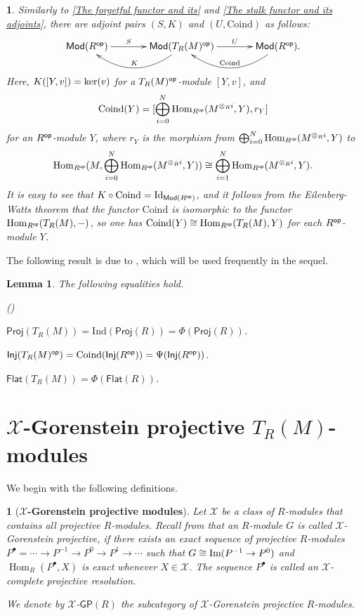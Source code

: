 \documentclass[10pt,twoside]{amsart}
\theoremstyle{bfupright head,slanted body}
\theoremstyle{bfupright head,upright body}
\newtheorem{bfhpg}[res]{}               \newtheorem*{bfhpg*}{}
\theoremstyle{fixed bf head,slanted body}
\newtheorem{lem}[res]{Lemma}            \newtheorem*{lem*}{Lemma}
\theoremstyle{fixed bf head,upright body}
\theoremstyle{numbered paragraph}
\newtheorem{ipg}[res]{}
\newlength{\thmlistleft}        %
\newlength{\thmlistright}       %
\newlength{\thmlistpartopsep}   %
\newlength{\thmlisttopsep}      %
\newlength{\thmlistparsep}      %
\newlength{\thmlistitemsep}     %
\newcounter{prt}
\newenvironment{prt}{\begin{list}{\upshape (\alph{prt})}%
    {\usecounter{prt}%
      \setlength{\leftmargin}{\thmlistleft}%
      \setlength{\labelwidth}{\thmlistleft}%
      \setlength{\rightmargin}{\thmlistright}%
      \setlength{\partopsep}{\thmlistpartopsep}%
      \setlength{\topsep}{\thmlisttopsep}%
      \setlength{\parsep}{\thmlistparsep}%
      \setlength{\itemsep}{\thmlistitemsep}}}%
  {\end{list}}%
\numberwithin{equation}{res}
\newcommand{\GP}{\mathsf{GP}}
\newcommand{\Proj}{\mathsf{Proj}}
\newcommand{\Inj}{\mathsf{Inj}}
\newcommand{\Flat}{\mathsf{Flat}}
\newcommand{\Mod}{\mathsf{Mod}}
\newcommand{\Coind}{\mathrm{Coind}}
\newcommand{\Ind}{\mathrm{Ind}}
\newcommand{\Id}{\mathrm{Id}}
\newcommand{\Rop}{R^{\sf op}}
\newcommand{\op}{\sf op}
\newcommand{\kernel}{\mbox{\rm ker}}
\newcommand{\im}{\mbox{\rm Im}}
\newcommand{\Hom}{\operatorname{Hom}}
\newcommand{\is}{\cong}
\begin{document}
\begin{ipg}\label{adjoint pairs-dual}
Similarly to \ref{The forgetful functor and its} and \ref{The stalk functor and its adjoints}, there are adjoint pairs $(S, K)$ and $(U, \Coind)$ as follows:
  \begin{equation*}
  \xymatrix@C=3pc{
    \Mod(\Rop)
    \ar[r]^-{S}
    &
    \Mod(T_R(M)^{\op})
    \ar@/^1.8pc/[l]_-{K}
    \ar[r]^-{U}
    &
    \Mod(\Rop).
    \ar@/^1.8pc/[l]_-{\Coind}
  }
  \end{equation*}
Here, $K([Y,v])=\kernel(v)$ for a $T_R(M)^{\op}$-module $[Y,v]$, and
$$\Coind(Y)=[\bigoplus_{i=0}^N\Hom_{\Rop}(M^{\otimes_Ri},Y),r_Y]$$
for an $\Rop$-module $Y$, where $r_Y$ is the morphism from
$\bigoplus_{i=0}^N\Hom_{\Rop}(M^{\otimes_Ri},Y)$ to
\[\Hom_{\Rop}(M,\bigoplus_{i=0}^N\Hom_{\Rop}(M^{\otimes_Ri},Y)) \cong
\bigoplus_{i=1}^N\Hom_{\Rop}(M^{\otimes_Ri},Y).\]
It is easy to see that $K\circ\Coind=\Id_{\Mod(\Rop)}$, and
it follows from the Eilenberg-Watts theorem that the functor $\Coind$ is isomorphic to the functor $\Hom_{\Rop}(T_R(M),-)$, so one has $\Coind(Y)\is \Hom_{\Rop}(T_R(M),Y)$ for each $\Rop$-module $Y$.
\end{ipg}

The following result is due to \cite[Lemma 1.9]{DL},
which will be used frequently in the sequel.

\begin{lem} \label{homological modules}
The following equalities hold.
\begin{prt}
\item $\Proj(T_R(M))=\Ind(\Proj(R))=\Phi(\Proj(R))$.
\item $\Inj(T_R(M)^{\op})=\Coind(\Inj(R^{\op}))=\Psi(\Inj(R^{\op}))$.
\item $\Flat(T_R(M))=\Phi(\Flat(R))$.
\end{prt}
\end{lem}









\section{$\mathcal{X}$-Gorenstein projective $T_R(M)$-modules}
\label{}%
\noindent
We begin with the following definitions.

\begin{bfhpg}[\bf $\mathcal{X}$-Gorenstein projective modules]
\label{}
Let $\mathcal{X}$ be a class of $R$-modules that contains all projective $R$-modules.
Recall from \cite{BO} that an $R$-module $G$ is called {\it $\mathcal{X}$-Gorenstein projective}, if there exists
an exact sequence of projective $R$-modules 
$P^{\bullet} = \cdots\to P^{-1} \to P^{0}\to P^{1}\to\cdots$ such that $G\cong\im(P^{-1}\to P^{0})$ 
and $\Hom_{R}(P^{\bullet}, X)$ is exact whenever $X\in\mathcal{X}$.
The sequence $P^{\bullet}$ is called an {\it $\mathcal{X}$-complete projective resolution}.

We denote by $\mathcal{X}$-$\GP(R)$ the subcategory of $\mathcal{X}$-Gorenstein projective $R$-modules.
\end{bfhpg}
\end{document}
